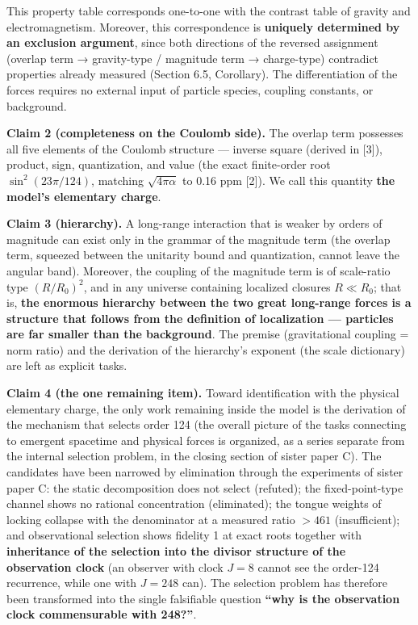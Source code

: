 \documentclass[
  a4paper,
]{article}
\begin{document}
This property table corresponds one-to-one with the contrast table of
gravity and electromagnetism. Moreover, this correspondence is
\textbf{uniquely determined by an exclusion argument}, since both
directions of the reversed assignment (overlap term → gravity-type /
magnitude term → charge-type) contradict properties already measured
(Section 6.5, Corollary). The differentiation of the forces requires no
external input of particle species, coupling constants, or background.

\textbf{Claim 2 (completeness on the Coulomb side).} The overlap term
possesses all five elements of the Coulomb structure --- inverse square
(derived in {[}3{]}), product, sign, quantization, and value (the exact
finite-order root \(\sin^2(23\pi/124)\), matching \(\sqrt{4\pi\alpha}\)
to 0.16 ppm {[}2{]}). We call this quantity \textbf{the model's
elementary charge}.

\textbf{Claim 3 (hierarchy).} A long-range interaction that is weaker by
orders of magnitude can exist only in the grammar of the magnitude term
(the overlap term, squeezed between the unitarity bound and
quantization, cannot leave the angular band). Moreover, the coupling of
the magnitude term is of scale-ratio type \((R/R_0)^2\), and in any
universe containing localized closures \(R\ll R_0\); that is,
\textbf{the enormous hierarchy between the two great long-range forces
is a structure that follows from the definition of localization ---
particles are far smaller than the background}. The premise
(gravitational coupling = norm ratio) and the derivation of the
hierarchy's exponent (the scale dictionary) are left as explicit tasks.

\textbf{Claim 4 (the one remaining item).} Toward identification with
the physical elementary charge, the only work remaining inside the model
is the derivation of the mechanism that selects order 124 (the overall
picture of the tasks connecting to emergent spacetime and physical
forces is organized, as a series separate from the internal selection
problem, in the closing section of sister paper C). The candidates have
been narrowed by elimination through the experiments of sister paper C:
the static decomposition does not select (refuted); the fixed-point-type
channel shows no rational concentration (eliminated); the tongue weights
of locking collapse with the denominator at a measured ratio \(>461\)
(insufficient); and observational selection shows fidelity 1 at exact
roots together with \textbf{inheritance of the selection into the
divisor structure of the observation clock} (an observer with clock
\(J=8\) cannot see the order-124 recurrence, while one with \(J=248\)
can). The selection problem has therefore been transformed into the
single falsifiable question \textbf{``why is the observation clock
commensurable with 248?''}.
\end{document}

